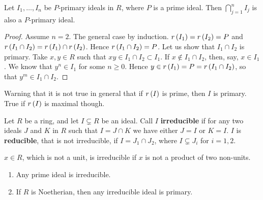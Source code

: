 \begin{lemma}
\label{lem:11.4}
Let $ I_1, \dots, I_n $ be $ P $-primary ideals in $ R $, where $ P $ is a prime ideal. Then $ \bigcap_{j = 1}^n I_j $ is also a $ P $-primary ideal.
\end{lemma}

\begin{proof}
Assume $ n = 2 $. The general case by induction. $ r\left( I_1 \right) = r\left( I_2 \right) = P $ and $ r\left( I_1 \cap I_2 \right) = r\left( I_1 \right) \cap r\left( I_2 \right) $. Hence $ r\left( I_1 \cap I_2 \right) = P $. Let us show that $ I_1 \cap I_2 $ is primary. Take $ x, y \in R $ such that $ xy \in I_1 \cap I_2 \subset I_1 $. If $ x \notin I_1 \cap I_2 $, then, say, $ x \in I_1 $. We know that $ y^n \in I_1 $ for some $ n \ge 0 $. Hence $ y \in r\left( I_1 \right) = P = r\left( I_1 \cap I_2 \right) $, so that $ y^m \in I_1 \cap I_2 $.
\end{proof}

Warning that it is not true in general that if $ r\left( I \right) $ is prime, then $ I $ is primary. True if $ r\left( I \right) $ is maximal though.


\begin{definition}
Let $ R $ be a ring, and let $ I \subsetneq R $ be an ideal. Call $ I $ \textbf{irreducible} if for any two ideals $ J $ and $ K $ in $ R $ such that $ I = J \cap K $ we have either $ J = I $ or $ K = I $. $ I $ is \textbf{reducible}, that is not irreducible, if $ I = J_1 \cap J_2 $, where $ I \subsetneq J_i $ for $ i = 1, 2 $.
\end{definition}

\begin{note*}
$ x \in R $, which is not a unit, is irreducible if $ x $ is not a product of two non-units.
\end{note*}

\begin{proposition}
\label{prop:11.5}
\hfill
\begin{enumerate}
\item Any prime ideal is irreducible.
\item If $ R $ is Noetherian, then any irreducible ideal is primary.
\end{enumerate}
\end{proposition}

